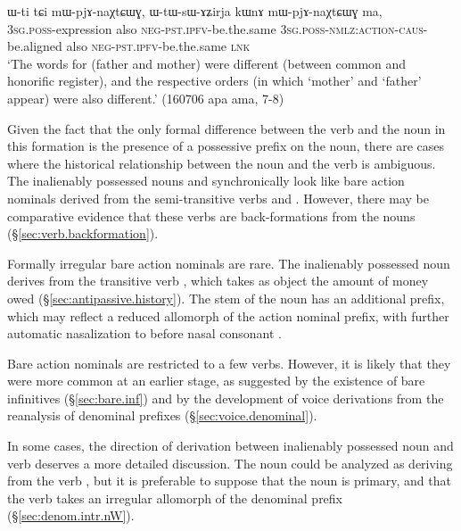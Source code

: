 \begin{exe}
\ex \label{ex:Wti.WtWsAZirja}
\gll  ɯ-ti tɕi mɯ-pjɤ-naχtɕɯɣ, ɯ-tɯ-sɯ-ɤʑirja kɯnɤ mɯ-pjɤ-naχtɕɯɣ ma, \\
\textsc{3sg}.\textsc{poss}-expression also \textsc{neg}-\textsc{pst}.\textsc{ipfv}-be.the.same \textsc{3sg}.\textsc{poss}-\textsc{nmlz}:\textsc{action}-\textsc{caus}-be.aligned also \textsc{neg}-\textsc{pst}.\textsc{ipfv}-be.the.same \textsc{lnk} \\
\glt `The words for (father and mother) were different (between common and honorific register), and the respective orders (in which `mother' and `father' appear) were also different.'  (160706 apa ama, 7-8)
\end{exe}

Given the fact that the only formal difference between the verb and the noun in this formation is the presence of a possessive prefix on the noun, there are cases where the historical relationship between the noun and the verb is ambiguous. The inalienably possessed nouns  and  synchronically look like bare action nominals derived from the semi-transitive verbs  and . However, there may be comparative evidence that these verbs are back-formations from the nouns (§\ref{sec:verb.backformation}).

Formally irregular bare action nominals are rare. The inalienably possessed noun  derives from the transitive verb , which takes as object the amount of money owed (§\ref{sec:antipassive.history}). The stem of the noun has an additional  prefix, which may reflect a reduced allomorph  of the  action nominal prefix, with further automatic nasalization to  before nasal consonant \citep{jacques14antipassive}.

Bare action nominals are restricted to a few verbs. However, it is likely that they were more common at an earlier stage, as suggested by the existence of bare infinitives (§\ref{sec:bare.inf}) and by the development of voice derivations from the reanalysis of denominal prefixes (§\ref{sec:voice.denominal}).

In some cases, the direction of derivation between inalienably possessed noun and verb deserves a more detailed discussion. The noun  could be analyzed as deriving from the verb , but it is preferable to suppose that the noun is primary, and that the verb takes an irregular allomorph of the denominal  prefix (§\ref{sec:denom.intr.nW}).


